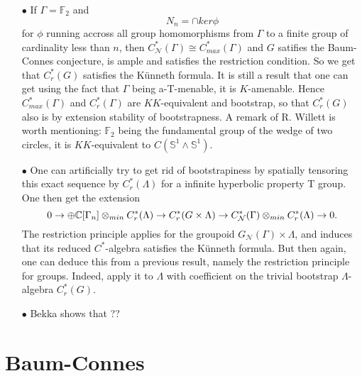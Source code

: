 \begin{itemize}
\item[$\bullet$] If $\Gamma= \mathbb F_2$ and 
\[N_n = \cap ker \phi \]
for $\phi$ running accross all group homomorphisms from $\Gamma$ to a finite group of cardinality less than $n$, then $C_{\mathcal N}^*(\Gamma) \cong C_{max}^*(\Gamma)$ and $G$ satifies the Baum-Connes conjecture, is ample and satisfies the restriction condition. So we get that $C_r^*(G)$ satisfies the Künneth formula. It is still a result that one can get using the fact that $\Gamma$ being a-T-menable, it is $K$-amenable. Hence $C^*_{max}(\Gamma)$ and $C_r^*(\Gamma)$ are $KK$-equivalent and bootstrap, so that $C_r^*(G)$ also is by extension stability of bootstrapness. A remark of R. Willett is worth mentioning: $\mathbb F_2$ being the fundamental group of the wedge of two circles, it is $KK$-equivalent to $C(\mathbb S^1 \wedge \mathbb S^1)$.\\
\item[$\bullet$] One can artificially try to get rid of bootstrapiness by spatially tensoring this exact sequence by $C_r^*(\Lambda)$ for a infinite hyperbolic property T group. One then get the extension
\[ 0 \rightarrow \oplus \mathbb C[\Gamma_n] \otimes_{min} C_r^*(\Lambda) \rightarrow C_r^*(G\times \Lambda) \rightarrow C^*_{\mathcal N} (\Gamma)\otimes_{min} C_r^*(\Lambda)   \rightarrow 0.\]
The restriction principle applies for the groupoid $G_{\mathcal N}(\Gamma)\times\Lambda$, and induces that its reduced $C^*$-algebra satisfies the Künneth formula. But then again, one can deduce this from a previous result, namely the restriction principle for groups. Indeed, apply it to $\Lambda$ with coefficient on the trivial bootstrap $\Lambda$-algebra $C_r^*(G)$.	\\ 
\item[$\bullet$] Bekka shows that ??
\end{itemize}

\section{Baum-Connes}

